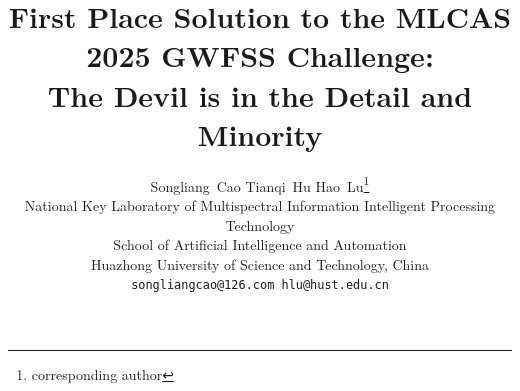 \documentclass[10pt,twocolumn,letterpaper]{article}
\title{First Place Solution to the MLCAS 2025 GWFSS Challenge:\\
The Devil is in the Detail and Minority}
\author{
Songliang~Cao \quad Tianqi~Hu \quad Hao~Lu\thanks{corresponding author}\\
National Key Laboratory of Multispectral Information Intelligent Processing Technology \\
School of Artificial Intelligence and Automation\\
Huazhong University of Science and Technology, China\\
{\tt\small songliangcao@126.com hlu@hust.edu.cn}
}
\begin{document}
\maketitle
    






{
    \small
    
    
}
\end{document}
